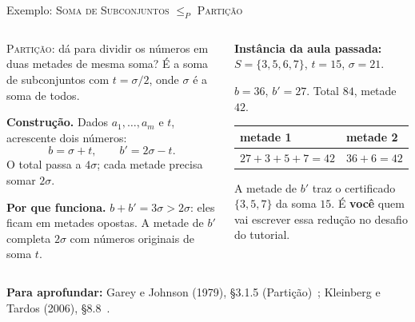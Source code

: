 \documentclass[aspectratio=169,xcolor=table]{beamer}
\newcommand{\fonte}[1]{%
  \vfill
  {\tiny\color{gray!55!black}\textbf{Para aprofundar:} #1\par}%
}
\newcommand{\prob}[1]{\textsc{#1}}
\begin{document}
\begin{frame}{Exemplo: \prob{Soma de Subconjuntos} $\le_P$ \prob{Partição}}
  \begin{columns}[T]
    \begin{column}{0.54\textwidth}
      \scriptsize
      \prob{Partição}: dá para dividir os números em duas metades de mesma soma? É a soma de
      subconjuntos com $t = \sigma / 2$, onde $\sigma$ é a soma de todos.
      \medskip

      \textbf{Construção.} Dados $a_1, \ldots, a_m$ e $t$, acrescente dois números:
      \[
        b = \sigma + t, \qquad b' = 2\sigma - t.
      \]
      O total passa a $4\sigma$; cada metade precisa somar $2\sigma$.
      \medskip

      \textbf{Por que funciona.} $b + b' = 3\sigma > 2\sigma$: eles ficam em metades opostas.
      A metade de $b'$ completa $2\sigma$ com números originais de soma $t$.
    \end{column}
    \begin{column}{0.42\textwidth}
      \scriptsize
      \textbf{Instância da aula passada:} $S = \{3, 5, 6, 7\}$, $t = 15$, $\sigma = 21$.
      \medskip

      $b = 36$, $b' = 27$. Total $84$, metade $42$.
      \medskip

      \begin{tabular}{ll}
        \toprule
        metade 1 & metade 2 \\
        \midrule
        $27 + 3 + 5 + 7 = 42$ & $36 + 6 = 42$ \\
        \bottomrule
      \end{tabular}
      \medskip

      A metade de $b'$ traz o certificado $\{3, 5, 7\}$ da soma $15$. É \textbf{você} quem vai
      escrever essa redução no desafio do tutorial.
    \end{column}
  \end{columns}
  \fonte{Garey e Johnson (1979), \S 3.1.5 (Partição)~\cite{garey1979computers};
    Kleinberg e Tardos (2006), \S 8.8~\cite{kleinberg2006algorithm}.}
\end{frame}
\end{document}
